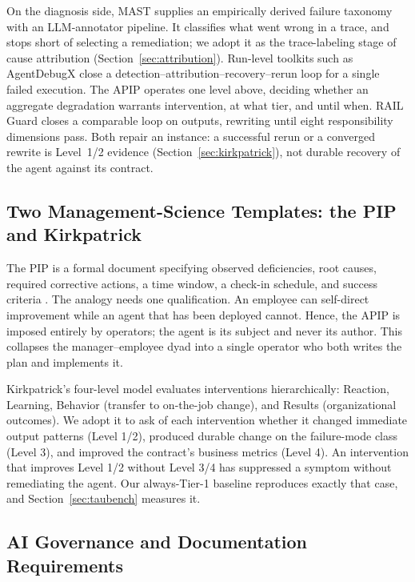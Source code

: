 \documentclass[conference]{IEEEtran}
\begin{document}
On the diagnosis side, MAST \cite{cemri2025} supplies an empirically derived
failure taxonomy with an LLM-annotator pipeline. It classifies what went wrong
in a trace, and stops short of selecting a remediation; we adopt it as the
trace-labeling stage of cause attribution (Section~\ref{sec:attribution}).
Run-level toolkits such as AgentDebugX \cite{zhu2026} close a
detection--attribution--recovery--rerun loop for a single failed execution. The
APIP operates one level above, deciding whether an aggregate degradation
warrants intervention, at what tier, and until when. RAIL Guard \cite{verma2026}
closes a comparable loop on outputs, rewriting until eight responsibility
dimensions pass. Both repair an instance: a successful rerun or a converged
rewrite is Level~1/2 evidence (Section~\ref{sec:kirkpatrick}), not durable
recovery of the agent against its contract.

\subsection{Two Management-Science Templates: the PIP and Kirkpatrick}
\label{sec:pip}

The PIP is a formal document specifying observed deficiencies, root causes,
required corrective actions, a time window, a check-in schedule, and success
criteria \cite{shrm2023}.
The analogy needs one qualification. An employee can self-direct improvement while
an agent that has been deployed cannot. Hence, the APIP is imposed entirely by operators;
the agent is its subject and never its author. This collapses the manager--employee
dyad into a single operator who both writes the plan and implements it.

\label{sec:kirkpatrick}

Kirkpatrick's four-level model \cite{kirkpatrick1994, kirkpatrick2016}
evaluates interventions hierarchically: Reaction, Learning, Behavior (transfer
to on-the-job change), and Results (organizational outcomes). We adopt it to
ask of each intervention whether it changed immediate output patterns
(Level 1/2), produced durable change on the failure-mode class (Level 3), and
improved the contract's business metrics (Level 4). An intervention that
improves Level 1/2 without Level 3/4 has suppressed a symptom without
remediating the agent. Our always-Tier-1 baseline reproduces exactly that case,
and Section~\ref{sec:taubench} measures it.

\subsection{AI Governance and Documentation Requirements}
\label{sec:governance}
\end{document}
